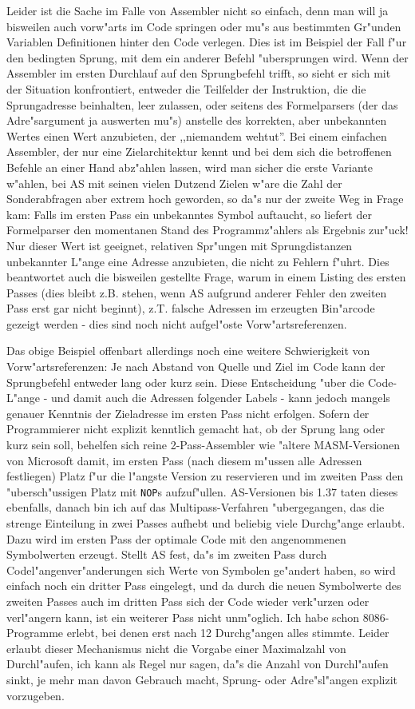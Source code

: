 \documentclass[12pt,a4paper,twoside]{report}
\newcommand{\tty}[1]{{\tt #1}}
\begin{document}
Leider ist die Sache im Falle von Assembler nicht so einfach, denn man
will ja bisweilen auch vorw"arts im Code springen oder mu"s aus bestimmten
Gr"unden Variablen Definitionen hinter den Code verlegen.  Dies ist
im Beispiel der Fall f"ur den bedingten Sprung, mit dem ein anderer
Befehl "ubersprungen wird.  Wenn der Assembler im ersten Durchlauf auf
den Sprungbefehl trifft, so sieht er sich mit der Situation konfrontiert,
entweder die Teilfelder der Instruktion, die die Sprungadresse beinhalten,
leer zulassen, oder seitens des Formelparsers (der das Adre"sargument ja
auswerten mu"s) anstelle des korrekten, aber unbekannten Wertes einen Wert
anzubieten, der ,,niemandem wehtut''.  Bei einem einfachen Assembler, der
nur eine Zielarchitektur kennt und bei dem sich die betroffenen Befehle
an einer Hand abz"ahlen lassen, wird man sicher die erste Variante w"ahlen,
bei AS mit seinen vielen Dutzend Zielen w"are die Zahl der Sonderabfragen
aber extrem hoch geworden, so da"s nur der zweite Weg in Frage kam: Falls
im ersten Pass ein unbekanntes Symbol auftaucht, so liefert der Formelparser
den momentanen Stand des Programmz"ahlers als Ergebnis zur"uck!  Nur dieser
Wert ist geeignet, relativen Spr"ungen mit Sprungdistanzen unbekannter
L"ange eine Adresse anzubieten, die nicht zu Fehlern f"uhrt.  Dies beantwortet
auch die bisweilen gestellte Frage, warum in einem Listing des ersten
Passes (dies bleibt z.B. stehen, wenn AS aufgrund anderer Fehler den
zweiten Pass erst gar nicht beginnt), z.T. falsche Adressen im erzeugten
Bin"arcode gezeigt werden - dies sind noch nicht aufgel"oste
Vorw"artsreferenzen.

Das obige Beispiel offenbart allerdings noch eine weitere Schwierigkeit
von Vorw"artsreferenzen: Je nach Abstand von Quelle und Ziel im Code kann
der Sprungbefehl entweder lang oder kurz sein.  Diese Entscheidung "uber
die Code-L"ange - und damit auch die Adressen folgender Labels - kann
jedoch mangels genauer Kenntnis der Zieladresse im ersten Pass nicht
erfolgen.  Sofern der Programmierer nicht explizit kenntlich gemacht hat,
ob der Sprung lang oder kurz sein soll, behelfen sich reine 2-Pass-Assembler
wie "altere MASM-Versionen von Microsoft damit, im ersten Pass (nach diesem
m"ussen alle Adressen festliegen) Platz f"ur die l"angste Version zu
reservieren und im zweiten Pass den "ubersch"ussigen Platz mit \tty{NOP}s
aufzuf"ullen.  AS-Versionen bis 1.37 taten dieses ebenfalls, danach bin
ich auf das Multipass-Verfahren "ubergegangen, das die strenge Einteilung
in zwei Passes aufhebt und beliebig viele Durchg"ange erlaubt.  Dazu wird
im ersten Pass der optimale Code mit den angenommenen Symbolwerten erzeugt.
Stellt AS fest, da"s im zweiten Pass durch Codel"angenver"anderungen sich
Werte von Symbolen ge"andert haben, so wird einfach noch ein dritter Pass
eingelegt, und da durch die neuen Symbolwerte des zweiten Passes auch
im dritten Pass sich der Code wieder verk"urzen oder verl"angern kann,
ist ein weiterer Pass nicht unm"oglich.  Ich habe schon 8086-Programme
erlebt, bei denen erst nach 12 Durchg"angen alles stimmte.  Leider
erlaubt dieser Mechanismus nicht die Vorgabe einer Maximalzahl von
Durchl"aufen, ich kann als Regel nur sagen, da"s die Anzahl von Durchl"aufen
sinkt, je mehr man davon Gebrauch macht, Sprung- oder Adre"sl"angen explizit
vorzugeben.
\end{document}
